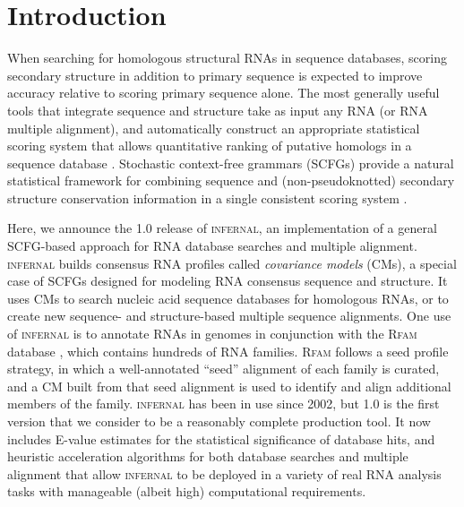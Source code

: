 \section{Introduction}

When searching for homologous structural RNAs in sequence databases,
scoring secondary structure in addition to primary sequence is
expected to improve accuracy relative to scoring primary sequence
alone. The most generally useful tools that integrate sequence
and structure take as input any RNA (or RNA multiple alignment), and
automatically construct an appropriate statistical scoring system that
allows quantitative ranking of putative homologs in a sequence
database \citep{Gautheret01,ZhangBafna05,Huang08}.  Stochastic
context-free grammars (SCFGs) provide a natural statistical framework
for combining sequence and (non-pseudoknotted) secondary structure
conservation information in a single consistent scoring system
\citep{Sakakibara94c,Eddy94,Brown00,Durbin98}.

Here, we announce the 1.0 release of \textsc{infernal}, an
implementation of a general SCFG-based approach for RNA database
searches and multiple alignment. \textsc{infernal} builds consensus
RNA profiles called \emph{covariance models} (CMs), a special case of
SCFGs designed for modeling RNA consensus sequence and structure. It
uses CMs to search nucleic acid sequence databases for homologous
RNAs, or to create new sequence- and structure-based multiple
sequence alignments. One use of \textsc{infernal} is to annotate RNAs
in genomes in conjunction with the \textsc{Rfam} database
\citep{Gardner09}, which contains hundreds of RNA families.
\textsc{Rfam} follows a seed profile strategy, in which a
well-annotated ``seed'' alignment of each family is curated, and a CM
built from that seed alignment is used to identify and align
additional members of the family.  \textsc{infernal} has been in use
since 2002, but 1.0 is the first version that we consider to be a
reasonably complete production tool. It now includes E-value estimates
for the statistical significance of database hits, and heuristic
acceleration algorithms for both database searches and multiple
alignment that allow \textsc{infernal} to be deployed in a variety of
real RNA analysis tasks with manageable (albeit high) computational
requirements.

